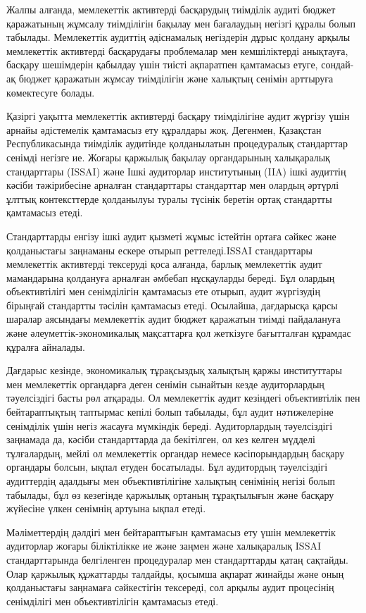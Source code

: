 \begin{multicols}{2}
Жалпы алғанда, мемлекеттік активтерді басқарудың тиімділік аудиті бюджет
қаражатының жұмсалу тиімділігін бақылау мен бағалаудың негізгі құралы
болып табылады. Мемлекеттік аудиттің әдіснамалық негіздерін дұрыс
қолдану арқылы мемлекеттік активтерді басқарудағы проблемалар мен
кемшіліктерді анықтауға, басқару шешімдерін қабылдау үшін тиісті
ақпаратпен қамтамасыз етуге, сондай-ақ бюджет қаражатын жұмсау
тиімділігін және халықтың сенімін арттыруға көмектесуге болады.

Қазіргі уақытта мемлекеттік активтерді басқару тиімділігіне аудит
жүргізу үшін арнайы әдістемелік қамтамасыз ету құралдары жоқ. Дегенмен,
Қазақстан Республикасында тиімділік аудитінде қолданылатын процедуралық
стандарттар сенімді негізге ие. Жоғары қаржылық бақылау органдарының
халықаралық стандарттары (ISSAI) және Ішкі аудиторлар институтының (IIA)
ішкі аудиттің кәсіби тәжірибесіне арналған стандарттары стандарттар мен
олардың әртүрлі ұлттық контексттерде қолданылуы туралы түсінік беретін
ортақ стандартты қамтамасыз етеді.

Стандарттарды енгізу ішкі аудит қызметі жұмыс істейтін ортаға сәйкес
және қолданыстағы заңнаманы ескере отырып реттеледі.ISSAI стандарттары
мемлекеттік активтерді тексеруді қоса алғанда, барлық мемлекеттік аудит
мамандарына қолдануға арналған әмбебап нұсқауларды береді. Бұл олардың
объективтілігі мен сенімділігін қамтамасыз ете отырып, аудит жүргізудің
бірыңғай стандартты тәсілін қамтамасыз етеді. Осылайша, дағдарысқа қарсы
шаралар аясындағы мемлекеттік аудит бюджет қаражатын тиімді пайдалануға
және әлеуметтік-экономикалық мақсаттарға қол жеткізуге бағытталған
құрамдас құралға айналады.

Дағдарыс кезінде, экономикалық тұрақсыздық халықтың қаржы институттары
мен мемлекеттік органдарға деген сенімін сынайтын кезде аудиторлардың
тәуелсіздігі басты рөл атқарады. Ол мемлекеттік аудит кезіндегі
объективтілік пен бейтараптықтың таптырмас кепілі болып табылады, бұл
аудит нәтижелеріне сенімділік үшін негіз жасауға мүмкіндік береді.
Аудиторлардың тәуелсіздігі заңнамада да, кәсіби стандарттарда да
бекітілген, ол кез келген мүдделі тұлғалардың, мейлі ол мемлекеттік
органдар немесе кәсіпорындардың басқару органдары болсын, ықпал етуден
босатылады. Бұл аудитордың тәуелсіздігі аудиттердің адалдығы мен
объективтілігіне халықтың сенімінің негізі болып табылады, бұл өз
кезегінде қаржылық ортаның тұрақтылығын және басқару жүйесіне үлкен
сенімнің артуына ықпал етеді.

Мәліметтердің дәлдігі мен бейтараптығын қамтамасыз ету үшін мемлекеттік
аудиторлар жоғары біліктілікке ие және заңмен және халықаралық ISSAI
стандарттарында белгіленген процедуралар мен стандарттарды қатаң
сақтайды. Олар қаржылық құжаттарды талдайды, қосымша ақпарат жинайды
және оның қолданыстағы заңнамаға сәйкестігін тексереді, сол арқылы аудит
процесінің сенімділігі мен объективтілігін қамтамасыз етеді.


\end{multicols}
